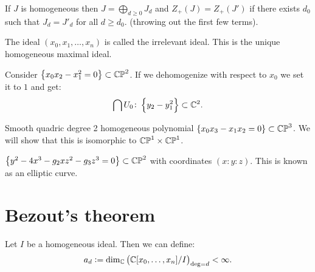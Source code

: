 \documentclass[11pt,a4paper]{article}
\begin{document}
\begin{remark}
  If $J$ is homogeneous then $J = \bigoplus_{d \geq 0} J_d$
  and $Z_+(J) = Z_+(J')$ if there exists $d_0$ such that $J_d = J'_d$
  for all $d \geq d_0$. (throwing out the first few terms).
\end{remark}

\begin{example}
  The ideal $(x_0,x_1,\dots,x_n)$ is called the irrelevant ideal.
  This is the unique homogeneous maximal ideal.
\end{example}

\begin{example}
  Consider $\left\{x_0 x_2 - x_1^2 = 0\right\} \subset \mathbb{CP}^2$.
  If we dehomogenize with respect to $x_0$ we set it to $1$
  and get:
  \[
    \bigcap U_0 \colon \left\{y_2 - y_1^2\right\} \subset \mathbb{C}^2.
  \]
\end{example}

\begin{example}
  Smooth quadric degree 2 homogeneous polynomial
  $\left\{x_0 x_3 - x_1 x_2 = 0\right\} \subset \mathbb{CP}^3$.
  We will show that this is isomorphic to $\mathbb{CP}^1 \times \mathbb{CP}^1$.
\end{example}

\begin{example}
  $\left\{y^2 - 4x^3 - g_2 x z^2 - g_3 z^3 = 0\right\} \subset \mathbb{CP}^2$
  with coordinates $(x : y : z)$.
  This is known as an elliptic curve.
\end{example}

\section{Bezout's theorem}

\begin{remark}
  Let $I$ be a homogeneous ideal.
  Then we can define:
  \[
    a_d := \dim_{\mathbb{C}}\left(\mathbb{C}[x_0,\dots,x_n] / I\right)_{\deg = d} < \infty.
  \]
\end{remark}
\end{document}
